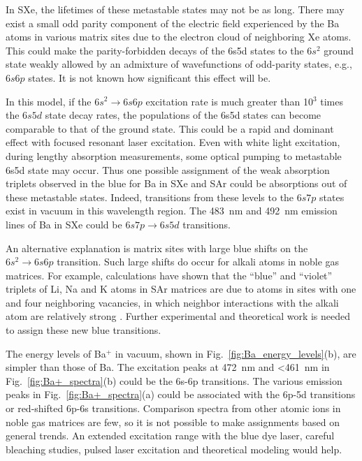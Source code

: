 \documentclass[aps,pra,reprint,superscriptaddress]{revtex4-1}
\begin{document}
In SXe, the lifetimes of these metastable states may not be as long.
There may exist a small odd parity component of the electric field experienced by the Ba atoms in various matrix sites due to the electron cloud of neighboring Xe atoms.
This could make the parity-forbidden decays of the 6s5d states to the $6s^2$ ground state weakly allowed by an admixture of wavefunctions of odd-parity states, e.g., $6s6p$ states.
It is not known how significant this effect will be.

In this model, if the $6s^2 \rightarrow 6s6p$ excitation rate is much greater than 10$^3$ times the $6s5d$ state decay rates, the populations of the 6s5d states can become comparable to that of the ground state.
This could be a rapid and dominant effect with focused resonant laser excitation.
Even with white light excitation, during lengthy absorption measurements, some optical pumping to metastable 6s5d state may occur.  
Thus one possible assignment of the weak absorption triplets observed in the blue for Ba in SXe and SAr could be absorptions out of these metastable states.
Indeed, transitions from these levels to the $6s7p$ states exist in vacuum in this wavelength region.
The 483~nm and 492~nm emission lines of Ba in SXe could be $6s7p \rightarrow 6s5d$ transitions.

An alternative explanation is matrix sites with large blue shifts on the $6s^2 \rightarrow 6s6p$ transition.
Such large shifts do occur for alkali atoms in noble gas matrices. 
For example, calculations have shown that the ``blue'' and ``violet'' triplets of Li, Na and K atoms in SAr matrices are due to atoms in sites with one and four neighboring vacancies, in which neighbor interactions with the alkali atom are relatively strong \cite{Jacquet2011}.
Further experimental and theoretical work is needed to assign these new blue transitions. 

The energy levels of Ba$^+$ in vacuum, shown in Fig.~\ref{fig:Ba_energy_levels}(b), are simpler than those of Ba.
The excitation peaks at 472~nm and  \textless 461~nm in Fig.~\ref{fig:Ba+_spectra}(b) could be the 6s-6p transitions.
The various emission peaks in Fig.~\ref{fig:Ba+_spectra}(a) could be associated with the 6p-5d transitions or red-shifted 6p-6s transitions.
Comparison spectra from other atomic ions in noble gas matrices are few, so it is not possible to make assignments based on general trends.
An extended excitation range with the blue dye laser, careful bleaching studies, pulsed laser excitation and theoretical modeling would help.
 
\end{document}
